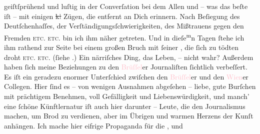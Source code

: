 \documentclass[twoside=false,titlepage=false,open=any, parskip=never, fontsize=12pt, headings=small, chapterprefix=false, appendixprefix=false]{scrbook}
\newcommand{\strikeout}[1]{\sout{#1}}
\newcommand{\Theight}{\dimexpr\fontcharht\font`W}
\newcommand{\pbposition}{\depth}
\newcommand{\pb}{\nobreak\hspace{0pt}\raisebox{-0.1em}{\raisebox{\pbposition}{\textnormal{|}}}\nobreak\hspace{0pt}}
\newcommand{\substVorne}{\textnormal{\raisebox{\Theight}{\raisebox{-\height}{\rotatebox[origin=c]{180}{v}\normalsize}}}}
\newcommand{\substDazwischen}{}
\newcommand{\substHinten}{\textnormal{\raisebox{\Theight}{\raisebox{-\height}{\small{v}\normalsize}}}}
\begin{document}
               geiſtſprühend und luſtig in der Converſation bei dem Allen und – was das beſte iſt –
               mit einigen \strikeout{k\textcolor{gray}{l}} Zügen, die entfernt an Dich erinnern. Nach Beſiegung des Deutſchenhaſſes, der
               Verſtändigungsſchwierigkeiten, des Mißtrauens gegen den Fremden \textsc{etc. etc.} bin ich ihm näher getreten. Und in dieſe\substVorne{}\textsuperscript{m}\substDazwischen{}n\substHinten{}{ }{\pb}Tagen ſtehe ich ihm rathend zur Seite bei einem
               großen Bruch mit ſeiner \label{K_L02669-2v}\label{K_L02669-2h}, die ſich zu
               tödten droht \textsc{etc. etc.} (ſiehe \label{K_L02669-4v}\label{K_L02669-4h}.) Ein närriſches Ding, das Leben, – nicht
               wahr? Außerdem haben ſich meine Beziehungen zu den \textcolor{pink}{Brüſſel}{}\ledrightnote{\textcolor{pink}{Brüssel}}er Journaliſten ſichtlich verbeſſert. Es iſt ein geradezu enormer
               Unterſchied zwiſchen den \textcolor{pink}{Brüſſel}{}\ledrightnote{\textcolor{pink}{Brüssel}}er und den \textcolor{pink}{Wien}{}\ledrightnote{\textcolor{pink}{Wien}}er Collegen. Hier ſind es – von wenigen
               Ausnahmen abgeſehen – liebe, gute Burſchen mit prächtigem Benehmen, voll Gefälligkeit
               und Liebenswürdigkeit, und manch’ eine ſchöne Künftlernatur iſt auch hier darunter –
               Leute, die den Journalismus machen, um Brod zu verdienen, aber im Übrigen \label{K_L02669-5v}\label{K_L02669-5h}
               und warmen Herzens der Kunſt anhängen. Ich mache hier eifrige Propaganda für die
                  \label{K_L02669-11v}\label{K_L02669-11h}, und
\end{document}
